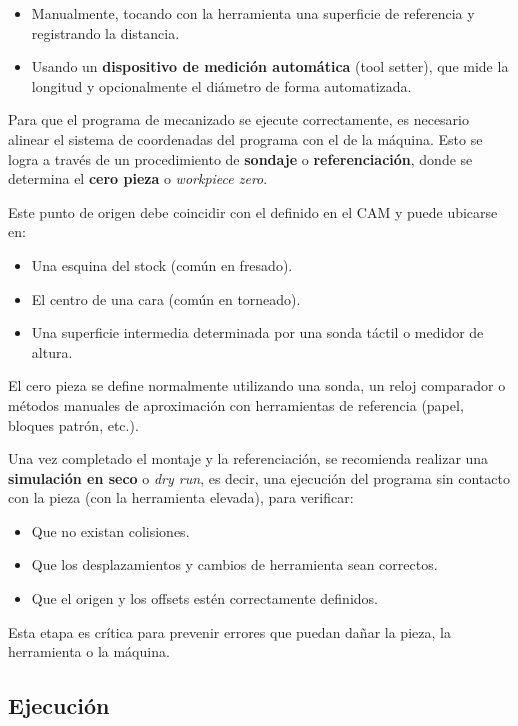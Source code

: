 \begin{itemize}
	\item Manualmente, tocando con la herramienta una superficie de referencia y registrando la distancia.
	\item Usando un \textbf{dispositivo de medición automática} (tool setter), que mide la longitud y opcionalmente el diámetro de forma automatizada.
\end{itemize}

Para que el programa de mecanizado se ejecute correctamente, es necesario alinear el sistema de coordenadas del programa con el de la máquina. Esto se logra a través de un procedimiento de \textbf{sondaje} o \textbf{referenciación}, donde se determina el \textbf{cero pieza} o \textit{workpiece zero}.

Este punto de origen debe coincidir con el definido en el CAM y puede ubicarse en:
\begin{itemize}
	\item Una esquina del stock (común en fresado).
	\item El centro de una cara (común en torneado).
	\item Una superficie intermedia determinada por una sonda táctil o medidor de altura.
\end{itemize}

El cero pieza se define normalmente utilizando una sonda, un reloj comparador o métodos manuales de aproximación con herramientas de referencia (papel, bloques patrón, etc.).

Una vez completado el montaje y la referenciación, se recomienda realizar una \textbf{simulación en seco} o \textit{dry run}, es decir, una ejecución del programa sin contacto con la pieza (con la herramienta elevada), para verificar:

\begin{itemize}
	\item Que no existan colisiones.
	\item Que los desplazamientos y cambios de herramienta sean correctos.
	\item Que el origen y los offsets estén correctamente definidos.
\end{itemize}

Esta etapa es crítica para prevenir errores que puedan dañar la pieza, la herramienta o la máquina.


\subsection{Ejecución}

